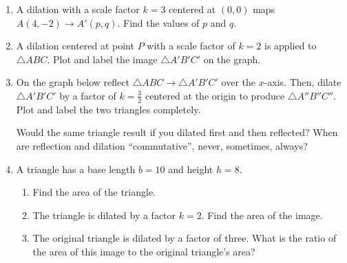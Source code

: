 \documentclass[12pt, twoside]{article}
\begin{document}
\begin{enumerate}
\item A dilation with a scale factor $k=3$ centered at $(0,0)$ maps $A(4,-2) \rightarrow A'(p,q)$. Find the values of $p$ and $q$. \vspace{2.5cm}

\item A dilation centered at point $P$ with a scale factor of $k=2$ is applied to $\triangle ABC$. Plot and label the image $\triangle A'B'C'$ on the graph.
\begin{center}
  \end{center}

\newpage
\item On the graph below reflect $\triangle ABC \rightarrow \triangle A'B'C'$ over the $x$-axis. Then, dilate $\triangle A'B'C'$ by a factor of $\displaystyle k=\frac{3}{2}$ centered at the origin to produce $\triangle A''B''C''$. Plot and label the two triangles completely.
\begin{center}
\end{center}
Would the same triangle result if you dilated first and then reflected? When are reflection and dilation ``commutative'', never, sometimes, always?

\item A triangle has a base length $b=10$ and height $h=8$. 
\begin{enumerate}[itemsep=1.5cm]
  \item Find the area of the triangle.
  \item The triangle is dilated by a factor $k=2$. Find the area of the image.
  \item The original triangle is dilated by a factor of three. What is the ratio of the area of this image to the original triangle's area?
\end{enumerate}

\end{enumerate}
\end{document}
